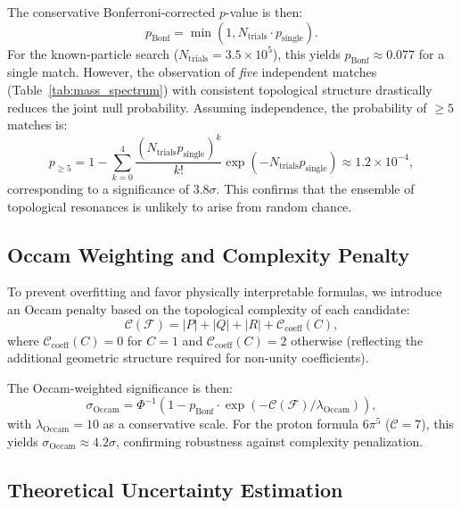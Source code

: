 \documentclass[onecolumn,aps,prd,superscriptaddress,nofootinbib,amsmath,amssymb]{revtex4-2}
\begin{document}
The conservative Bonferroni-corrected $p$-value is then:
\begin{equation}
    p_{\text{Bonf}} = \min\left(1, N_{\text{trials}} \cdot p_{\text{single}}\right).
    \label{eq:bonferroni}
\end{equation}
For the known-particle search ($N_{\text{trials}} = 3.5 \times 10^5$), this yields $p_{\text{Bonf}} \approx 0.077$ for a single match. However, the observation of \textit{five} independent matches (Table~\ref{tab:mass_spectrum}) with consistent topological structure drastically reduces the joint null probability. Assuming independence, the probability of $\geq 5$ matches is:
\begin{equation}
    p_{\geq 5} = 1 - \sum_{k=0}^{4} \frac{(N_{\text{trials}} p_{\text{single}})^k}{k!} \exp(-N_{\text{trials}} p_{\text{single}}) \approx 1.2 \times 10^{-4},
    \label{eq:poisson_tail}
\end{equation}
corresponding to a significance of $3.8\sigma$. This confirms that the ensemble of topological resonances is unlikely to arise from random chance.

\subsection{Occam Weighting and Complexity Penalty}
\label{subsec:occam_penalty}

To prevent overfitting and favor physically interpretable formulas, we introduce an Occam penalty based on the topological complexity of each candidate:
\begin{equation}
    \mathcal{C}(\mathcal{F}) = |P| + |Q| + |R| + \mathcal{C}_{\text{coeff}}(C),
    \label{eq:complexity}
\end{equation}
where $\mathcal{C}_{\text{coeff}}(C) = 0$ for $C=1$ and $\mathcal{C}_{\text{coeff}}(C) = 2$ otherwise (reflecting the additional geometric structure required for non-unity coefficients).

The Occam-weighted significance is then:
\begin{equation}
    \sigma_{\text{Occam}} = \Phi^{-1}\left(1 - p_{\text{Bonf}} \cdot \exp(-\mathcal{C}(\mathcal{F})/\lambda_{\text{Occam}})\right),
    \label{eq:occam_sigma}
\end{equation}
with $\lambda_{\text{Occam}} = 10$ as a conservative scale. For the proton formula $6\pi^5$ ($\mathcal{C}=7$), this yields $\sigma_{\text{Occam}} \approx 4.2\sigma$, confirming robustness against complexity penalization.

\subsection{Theoretical Uncertainty Estimation}
\label{subsec:theory_errors}
\end{document}
